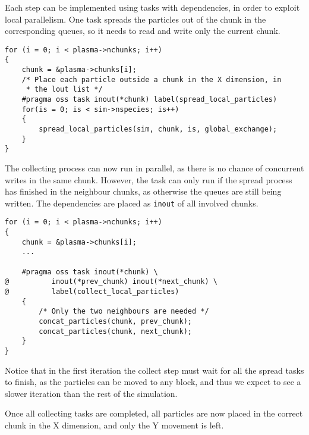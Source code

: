Each step can be implemented using tasks with dependencies, in order to exploit 
local parallelism. One task spreads the particles out of the chunk in the 
corresponding queues, so it needs to read and write only the current chunk.
%
\begin{lstlisting}
for (i = 0; i < plasma->nchunks; i++)
{
	chunk = &plasma->chunks[i];
	/* Place each particle outside a chunk in the X dimension, in
	 * the lout list */
	#pragma oss task inout(*chunk) label(spread_local_particles)
	for(is = 0; is < sim->nspecies; is++)
	{
		spread_local_particles(sim, chunk, is, global_exchange);
	}
}
\end{lstlisting}
%
The collecting process can now run in parallel, as there is no chance of 
concurrent writes in the same chunk. However, the task can only run if the 
spread process has finished in the neighbour chunks, as otherwise the queues are 
still being written. The dependencies are placed as \texttt{inout} of all 
involved chunks.
%
\begin{lstlisting}
for (i = 0; i < plasma->nchunks; i++)
{
	chunk = &plasma->chunks[i];
	...

	#pragma oss task inout(*chunk) \
@          inout(*prev_chunk) inout(*next_chunk) \
@          label(collect_local_particles)
	{
		/* Only the two neighbours are needed */
		concat_particles(chunk, prev_chunk);
		concat_particles(chunk, next_chunk);
	}
}
\end{lstlisting}
%
Notice that in the first iteration the collect step must wait for all the spread 
tasks to finish, as the particles can be moved to any block, and thus we expect 
to see a slower iteration than the rest of the simulation.

Once all collecting tasks are completed, all particles are now placed in the 
correct chunk in the X dimension, and only the Y movement is left.

